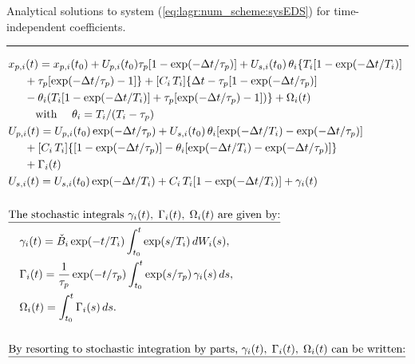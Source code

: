 \begin{table}[htbp]
\caption{Analytical solutions to system (\ref{eq:lagr:num_scheme:sysEDS}) for time-independent coefficients.}
\hrule
\begin{align}
& x_{p,i}(t) = x_{p,i}(t_0)
  + U_{p,i}(t_0)\tau_p  [1-\exp(-\Delta t/\tau_p)]
  + U_{s,i}(t_0)\,\theta_i \{T_i[1-\exp(-\Delta t/T_i)] \notag \\
&  \hspace*{5mm} + \tau_p[\exp(-\Delta t/\tau_p)-1]\}
  + [C_i\,T_i]
    \{\Delta t-\tau_p[1-\exp(-\Delta t/\tau_p)] \notag \\
&  \hspace*{5mm} - \theta_i (T_i[1-\exp(-\Delta t/T_i)]+
      \tau_p[\exp(-\Delta t/\tau_p)-1])\}
     + \Omega_i(t) \label{eq:lagr:num_scheme:xpa_exa} \\
&  \hspace*{5mm} \text{\quad with \quad} \theta_i = T_i/(T_i-\tau_p)
  \notag \\
& U_{p,i}(t) = U_{p,i}(t_0)\exp(-\Delta t/\tau_p)
  + U_{s,i}(t_0)\,\theta_i
    [\exp(-\Delta t/T_i)-\exp(-\Delta t/\tau_p)] \notag \\
& \hspace*{5mm} + [C_i\,T_i]
    \{[1-\exp(-\Delta t/\tau_p)]-\theta_i
      [\exp(-\Delta t/T_i)-\exp(-\Delta t/\tau_p)]\} \notag \\
& \hspace*{5mm} + \Gamma_i(t) \label{eq:lagr:num_scheme:Upa_exa} \\
& U_{s,i}(t) = U_{s,i}(t_0)\exp(-\Delta t/T_i)
  + C_i\,T_i[1-\exp(-\Delta t/T_i)]
  + \gamma _i(t) \label{eq:lagr:num_scheme:Ufa_exa} \\ \notag \\
& \text{\underline{The stochastic integrals $\gamma _i(t),\;\Gamma
_i(t),\;\Omega _i(t)$ are given by:}}\notag \\
& \quad \gamma _i(t) = \Check{B}_i\exp(-t/T_i)
  \int _{t_0}^{t} \exp(s/T_i)\,dW_i(s), \label{eq:lagr:num_scheme:gamma_exa}\\
& \quad \Gamma _i(t) = \frac{1}{\tau_p}\exp(-t/\tau_p)
  \int _{t_0}^{t}\exp(s/\tau_p)\,\gamma _i(s)\,ds, \label{eq:lagr:num_scheme:Gamma_exa}\\
& \quad \Omega _i(t) = \int _{t_0}^{t}\Gamma
_i(s)\,ds. \label{eq:lagr:num_scheme:Omega_exa} \\ \notag \\
& \text{\underline{By resorting to stochastic integration by parts, $\gamma
_i(t),\;\Gamma _i(t),\;\Omega _i(t)$ can be written:}}\notag \\

\end{align}
\end{table}
